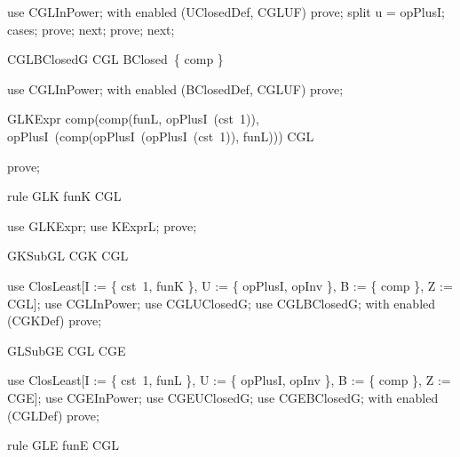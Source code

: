 \documentclass{article}
\begin{document}
\begin{zproof}
use CGLInPower;
with enabled (UClosedDef, CGLUF) prove;
split u = opPlusI;
cases;
prove;
next;
prove;
next;
\end{zproof}

\begin{theorem}{CGLBClosedG}
  CGL \in BClosed~\{ comp \}
\end{theorem}

\begin{zproof}
use CGLInPower;
with enabled (BClosedDef, CGLUF) prove;
\end{zproof}

\begin{theorem}{GLKExpr}
  comp(comp(funL, opPlusI~(cst~1)), opPlusI~(comp(opPlusI~(opPlusI~(cst~1)), funL))) \in CGL
\end{theorem}

\begin{zproof}
prove;
\end{zproof}

\begin{theorem}{rule GLK}
  funK \in CGL
\end{theorem}

\begin{zproof}
use GLKExpr;
use KExprL;
prove;
\end{zproof}

\begin{theorem}{GKSubGL}
  CGK \subseteq CGL
\end{theorem}

\begin{zproof}
use ClosLeast[I := \{ cst~1, funK \}, U := \{ opPlusI, opInv \}, B := \{ comp \}, Z := CGL];
use CGLInPower;
use CGLUClosedG;
use CGLBClosedG;
with enabled (CGKDef) prove;
\end{zproof}

\begin{theorem}{GLSubGE}
  CGL \subseteq CGE
\end{theorem}

\begin{zproof}
use ClosLeast[I := \{ cst~1, funL \}, U := \{ opPlusI, opInv \}, B := \{ comp \}, Z := CGE];
use CGEInPower;
use CGEUClosedG;
use CGEBClosedG;
with enabled (CGLDef) prove;
\end{zproof}


\begin{theorem}{rule GLE}
  funE \in CGL
\end{theorem}
\end{document}

